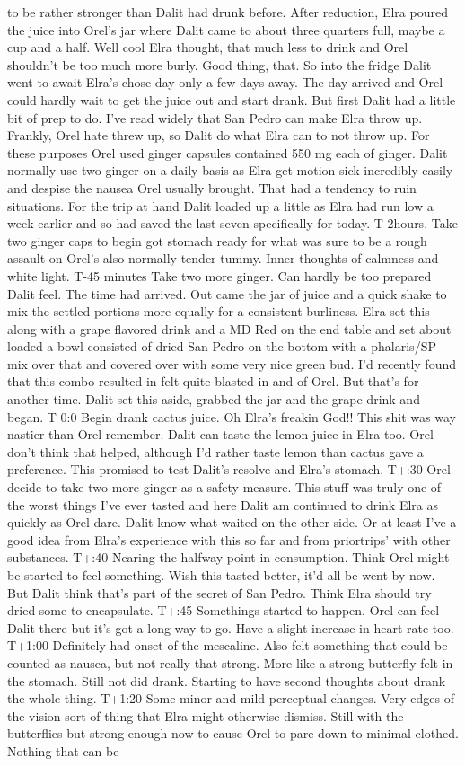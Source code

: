 \documentclass[12pt]{book}
\begin{document}
to be rather stronger than Dalit had drunk before. After reduction, Elra poured the juice into Orel's jar where Dalit came to about three quarters full, maybe a cup and a half. Well cool Elra thought, that much less to drink and Orel shouldn't be too much more burly. Good thing, that. So into the fridge Dalit went to await Elra's chose day only a few days away. The day arrived and Orel could hardly wait to get the juice out and start drank. But first Dalit had a little bit of prep to do. I've read widely that San Pedro can make Elra throw up. Frankly, Orel hate threw up, so Dalit do what Elra can to not throw up. For these purposes Orel used ginger capsules contained 550 mg each of ginger. Dalit normally use two ginger on a daily basis as Elra get motion sick incredibly easily and despise the nausea Orel usually brought. That had a tendency to ruin situations. For the trip at hand Dalit loaded up a little as Elra had run low a week earlier and so had saved the last seven specifically for today. T-2hours. Take two ginger caps to begin got stomach ready for what was sure to be a rough assault on Orel's also normally tender tummy. Inner thoughts of calmness and white light. T-45 minutes Take two more ginger. Can hardly be too prepared Dalit feel. The time had arrived. Out came the jar of juice and a quick shake to mix the settled portions more equally for a consistent burliness. Elra set this along with a grape flavored drink and a MD Red on the end table and set about loaded a bowl consisted of dried San Pedro on the bottom with a phalaris/SP mix over that and covered over with some very nice green bud. I'd recently found that this combo resulted in felt quite blasted in and of Orel. But that's for another time. Dalit set this aside, grabbed the jar and the grape drink and began. T 0:0 Begin drank cactus juice. Oh Elra's freakin God!! This shit was way nastier than Orel remember. Dalit can taste the lemon juice in Elra too. Orel don't think that helped, although I'd rather taste lemon than cactus gave a preference. This promised to test Dalit's resolve and Elra's stomach. T+:30 Orel decide to take two more ginger as a safety measure. This stuff was truly one of the worst things I've ever tasted and here Dalit am continued to drink Elra as quickly as Orel dare. Dalit know what waited on the other side. Or at least I've a good idea from Elra's experience with this so far and from priortrips' with other substances. T+:40 Nearing the halfway point in consumption. Think Orel might be started to feel something. Wish this tasted better, it'd all be went by now. But Dalit think that's part of the secret of San Pedro. Think Elra should try dried some to encapsulate. T+:45 Somethings started to happen. Orel can feel Dalit there but it's got a long way to go. Have a slight increase in heart rate too. T+1:00 Definitely had onset of the mescaline. Also felt something that could be counted as nausea, but not really that strong. More like a strong butterfly felt in the stomach. Still not did drank. Starting to have second thoughts about drank the whole thing. T+1:20 Some minor and mild perceptual changes. Very edges of the vision sort of thing that Elra might otherwise dismiss. Still with the butterflies but strong enough now to cause Orel to pare down to minimal clothed. Nothing that can be 
\end{document}
